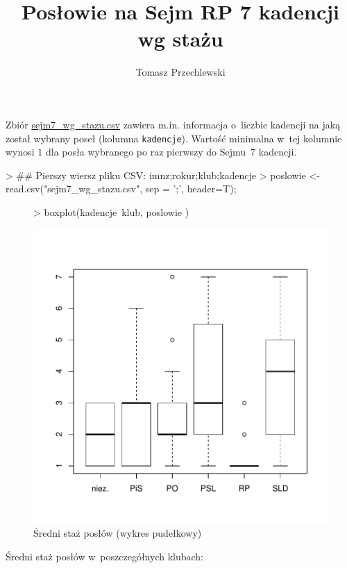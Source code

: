 \documentclass[a4paper]{article}
\title{Posłowie na Sejm RP 7 kadencji wg stażu}
\author{Tomasz Przechlewski}
\begin{document}
\maketitle

Zbiór \url{sejm7_wg_stazu.csv} zawiera m.in. informacja o~liczbie kadencji
na jaką został wybrany poseł (kolumna \texttt{kadencje}). Wartość minimalna
w~tej kolumnie 
wynosi $1$ dla posła wybranego po raz pierwszy do Sejmu~7 kadencji.

\begin{Schunk}
\begin{Sinput}
> ## Pierszy wiersz pliku CSV: imnz;rokur;klub;kadencje
> poslowie <- read.csv("sejm7_wg_stazu.csv", sep = ';',  header=T);
\end{Sinput}
\end{Schunk}

\begin{figure}[!tbh]
\begin{Schunk}
\begin{Sinput}
> boxplot(kadencje~klub, poslowie )
\end{Sinput}
\end{Schunk}
\includegraphics{sejm7_wg_stazu-002}
\caption{Średni staż posłów (wykres pudełkowy)}
\end{figure}

Średni staż posłów w~poszczegółnych klubach:
\end{document}
